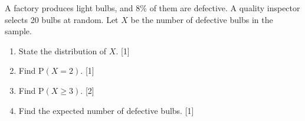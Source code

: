 \documentclass[12pt, twoside]{article}
\begin{document}
\begin{enumerate}[itemsep=0.15cm]
A factory produces light bulbs, and 8\% of them are defective. A quality
inspector selects 20 bulbs at random. Let $X$ be the number of defective
bulbs in the sample.

\begin{enumerate}[itemsep=0.1cm]
  \item State the distribution of $X$. \hfill [1]
  \item Find $\mathrm{P}(X = 2)$. \hfill [1]
  \item Find $\mathrm{P}(X \geq 3)$. \hfill [2]
  \item Find the expected number of defective bulbs. \hfill [1]
\end{enumerate}


\end{enumerate}
\end{document}
